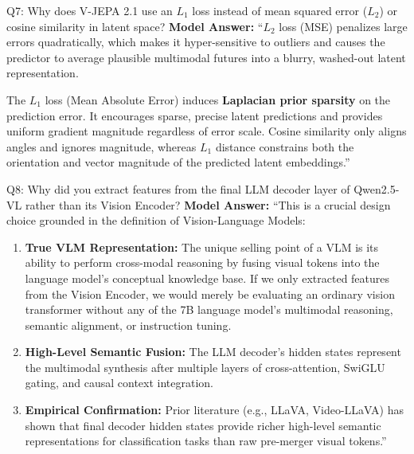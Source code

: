 \documentclass[a4paper, 11pt]{article}
\begin{document}
\begin{defensebox}{Q7: Why does V-JEPA 2.1 use an $L_1$ loss instead of mean squared error ($L_2$) or cosine similarity in latent space?}
\textbf{Model Answer:}
``$L_2$ loss (MSE) penalizes large errors quadratically, which makes it hyper-sensitive to outliers and causes the predictor to average plausible multimodal futures into a blurry, washed-out latent representation.

The $L_1$ loss (Mean Absolute Error) induces \textbf{Laplacian prior sparsity} on the prediction error. It encourages sparse, precise latent predictions and provides uniform gradient magnitude regardless of error scale. Cosine similarity only aligns angles and ignores magnitude, whereas $L_1$ distance constrains both the orientation and vector magnitude of the predicted latent embeddings.''
\end{defensebox}

\vspace{0.2cm}

\begin{defensebox}{Q8: Why did you extract features from the final LLM decoder layer of Qwen2.5-VL rather than its Vision Encoder?}
\textbf{Model Answer:}
``This is a crucial design choice grounded in the definition of Vision-Language Models:
\begin{enumerate}
    \item \textbf{True VLM Representation:} The unique selling point of a VLM is its ability to perform cross-modal reasoning by fusing visual tokens into the language model's conceptual knowledge base. If we only extracted features from the Vision Encoder, we would merely be evaluating an ordinary vision transformer without any of the 7B language model's multimodal reasoning, semantic alignment, or instruction tuning.
    \item \textbf{High-Level Semantic Fusion:} The LLM decoder's hidden states represent the multimodal synthesis after multiple layers of cross-attention, SwiGLU gating, and causal context integration.
    \item \textbf{Empirical Confirmation:} Prior literature (e.g., LLaVA, Video-LLaVA) has shown that final decoder hidden states provide richer high-level semantic representations for classification tasks than raw pre-merger visual tokens.''
\end{enumerate}
\end{defensebox}

\vspace{0.2cm}
\end{document}

